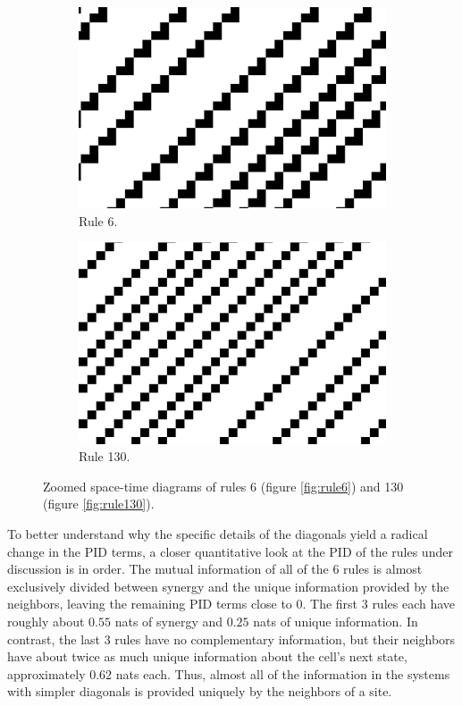 \documentclass[12pt]{article}
\begin{document}
\begin{figure} [!h]
\begin{subfigure}{.5\textwidth}
  \centering
  \includegraphics[width=.9\linewidth]{rule6-zoomed}
  \caption{Rule 6.}
  \label{fig:rule6-zoomed}
\end{subfigure}%
\begin{subfigure}{.5\textwidth}
  \centering
  \includegraphics[width=.9\linewidth]{rule130-zoomed}
  \caption{Rule 130.}
  \label{fig:rule130-zoomed}
\end{subfigure}
\caption{Zoomed space-time diagrams of rules 6 (figure \ref{fig:rule6}) and 130 (figure \ref{fig:rule130}).} 
\label{fig:eca-diagonals-zoomed}
\end{figure}

To better understand why the specific details of the diagonals yield a radical change in the PID terms, a closer quantitative look at the PID of the rules under discussion is in order. The mutual information of all of the 6 rules is almost exclusively divided between synergy and the unique information provided by the neighbors, leaving the remaining PID terms close to 0. The first 3 rules each have roughly about $0.55$ nats of synergy and $0.25$ nats of unique information. In contrast, the last 3 rules have no complementary information, but their neighbors have about twice as much unique information about the cell's next state, approximately $0.62$ nats each. Thus, almost all of the information in the systems with simpler diagonals is provided uniquely by the neighbors of a site. 
\end{document}
